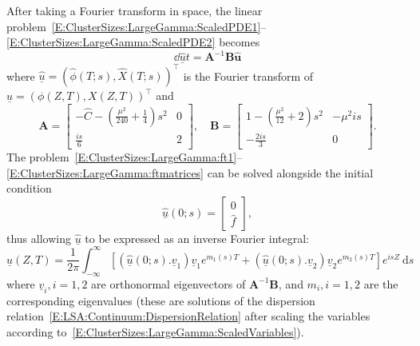 After taking a Fourier transform in space, the linear problem~\eqref{E:ClusterSizes:LargeGamma:ScaledPDE1}--\eqref{E:ClusterSizes:LargeGamma:ScaledPDE2} becomes
\begin{equation}\label{E:ClusterSizes:LargeGamma:ft1}
\dd{\hat{\underline{u}}}{t} =\mathbf{A}^{-1}\mathbf{B}\hat{\mathbf{u}}
\end{equation}
where $\hat{\underline{u}} = (\hat{\phi}(T;s), \hat{X}(T;s))^\intercal$ is the Fourier transform of $\underline{u} = (\phi(Z,T), X(Z,T))^\intercal$ and
\begin{equation}\label{E:ClusterSizes:LargeGamma:ftmatrices}
\mathbf{A} = \begin{bmatrix}
-\hat{C} - \left(\frac{\mu^2}{240} +\frac{1}{4}\right) s^2 & 0 \\
\frac{is}{6} & 2
\end{bmatrix}, \quad \mathbf{B}= \begin{bmatrix}
1 - \left(\frac{\mu^2}{12} +2\right) s^2 & -\mu^2 i s \\
-\frac{2is}{3} & 0
\end{bmatrix}.
\end{equation}
The problem~\eqref{E:ClusterSizes:LargeGamma:ft1}--\eqref{E:ClusterSizes:LargeGamma:ftmatrices} can be solved alongside the initial condition
\begin{equation}
\hat{\underline{u}}(0;s) = \begin{bmatrix}
0\\ \hat{f}
\end{bmatrix},
\end{equation}
thus allowing $\hat{\underline{u}}$ to be expressed as an inverse Fourier integral:
\begin{equation}\label{E:ClusterSizes:LargeGamma:ft_inverse}
\underline{u}(Z,T) = \frac{1}{2\pi}\int_{-\infty}^{\infty} \left[(\hat{\underline{u}}(0;s).\underline{v}_1) \underline{v}_1 e^{m_1(s) T }+(\hat{\underline{u}}(0;s).\underline{v}_2) \underline{v}_2 e^{m_2(s) T }\right]e^{isZ}~\mathrm{d}s
\end{equation}
where $\underline{v}_i, i = 1,2$ are orthonormal eigenvectors of $ \mathbf{A}^{-1}\mathbf{B}$, and $m_i, i = 1,2$ are the corresponding eigenvalues (these are solutions of the dispersion relation~\eqref{E:LSA:Continuum:DispersionRelation} after scaling the variables according to~\eqref{E:ClusterSizes:LargeGamma:ScaledVariables}).

